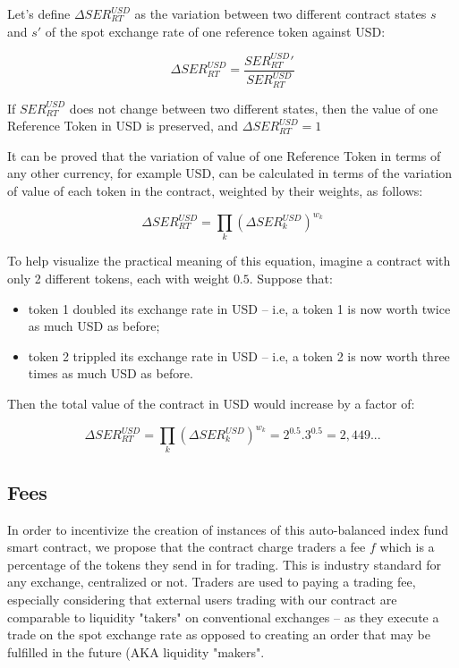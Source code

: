\documentclass[11pt]{amsart}
\begin{document}
Let's define $\Delta SER^{USD}_{RT}$ as the variation between two different contract states $s$ and $s'$ of the spot exchange rate of one reference token against USD:

\begin{equation}
\Delta SER^{USD}_{RT} = \frac{SER^{USD}_{RT}'}{SER^{USD}_{RT}}
\end{equation}

If $SER^{USD}_{RT}$ does not change between two different states, then the value of one Reference Token in USD is preserved, and $\Delta SER^{USD}_{RT} = 1$

It can be proved that the variation of value of one Reference Token in terms of any other currency, for example USD, can be calculated in terms of the variation of value of each token in the contract, weighted by their weights, as follows:

\begin{equation}
\Delta SER^{USD}_{RT} =\prod_{k}(\Delta SER^{USD}_{k})^{w_k}
\end{equation}

To help visualize the practical meaning of this equation, imagine a contract with only 2 different tokens, each with weight $0.5$. Suppose that:

\begin{itemize}
    \item token 1 doubled its exchange rate in USD -- i.e, a token 1 is now worth twice as much USD as before;
    \item token 2 trippled its exchange rate in USD -- i.e, a token 2 is now worth three times as much USD as before.
\end{itemize}

Then the total value of the contract in USD would increase by a factor of:

\begin{equation*}
\Delta SER^{USD}_{RT} =\prod_{k}(\Delta SER^{USD}_{k})^{w_k} = 2^{0.5} . 3^{0.5} = 2,449...
\end{equation*}

\subsection{Fees}

In order to incentivize the creation of instances of this auto-balanced index fund smart contract, we propose that the contract charge traders a fee $f$ which is a percentage of the tokens they send in for trading. This is industry standard for any exchange, centralized or not. Traders are used to paying a trading fee, especially considering that external users trading with our contract are comparable to liquidity "takers" on conventional exchanges -- as they execute a trade on the spot exchange rate as opposed to creating an order that may be fulfilled in the future (AKA liquidity "makers".
\end{document}
